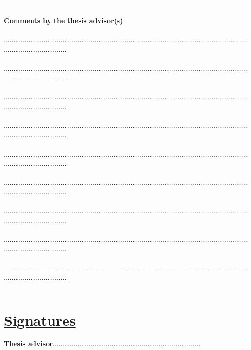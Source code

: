 \documentclass[11pt,titlepage]{article}
\begin{document}
\newpage
\textcolor{white}.\\\\
\noindent \textbf{Comments by the thesis advisor(s)}\\\\
...................................................................................................................................................................\\\\
...................................................................................................................................................................\\\\
...................................................................................................................................................................\\\\
...................................................................................................................................................................\\\\
...................................................................................................................................................................\\\\
...................................................................................................................................................................\\\\
...................................................................................................................................................................\\\\
...................................................................................................................................................................\\\\
...................................................................................................................................................................\\\\


\section*{\underline{Signatures}\\}
\noindent \textbf{Thesis advisor}\hspace{6.25cm}..............................................................................\vspace{0.5cm}\\
\end{document}
